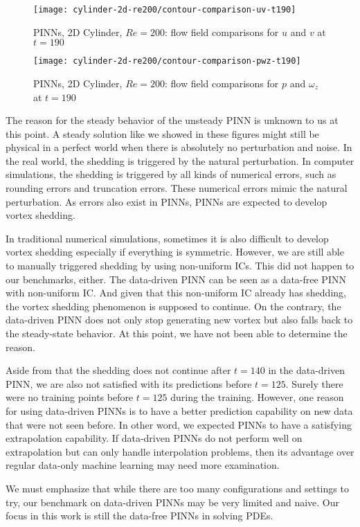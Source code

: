\begin{figure}[hbt!]
    \texttt{[image: cylinder-2d-re200/contour-comparison-uv-t190]}
    \caption{PINNs, 2D Cylinder, $Re=200$: flow field comparisons for $u$ and $v$ at $t=190$}
    \label{fig:cylinder-re200-contour-uv-t190}
\end{figure}

\begin{figure}[hbt!]
    \texttt{[image: cylinder-2d-re200/contour-comparison-pwz-t190]}
    \caption{PINNs, 2D Cylinder, $Re=200$: flow field comparisons for $p$ and $\omega_z$ at $t=190$}
    \label{fig:cylinder-re200-contour-pwz-t190}
\end{figure}

The reason for the steady behavior of the unsteady PINN is unknown to us at this point.
A steady solution like we showed in these figures might still be physical in a perfect world when there is absolutely no perturbation and noise.
In the real world, the shedding is triggered by the natural perturbation.
In computer simulations, the shedding is triggered by all kinds of numerical errors, such as rounding errors and truncation errors.
These numerical errors mimic the natural perturbation.
As errors also exist in PINNs, PINNs are expected to develop vortex shedding.

In traditional numerical simulations, sometimes it is also difficult to develop vortex shedding especially if everything is symmetric.
However, we are still able to manually triggered shedding by using non-uniform ICs.
This did not happen to our benchmarks, either.
The data-driven PINN can be seen as a data-free PINN with non-uniform IC.
And given that this non-uniform IC already has shedding, the vortex shedding phenomenon is supposed to continue.
On the contrary, the data-driven PINN does not only stop generating new vortex but also falls back to the steady-state behavior.
At this point, we have not been able to determine the reason.

Aside from that the shedding does not continue after $t=140$ in the data-driven PINN, we are also not satisfied with its predictions before $t=125$.
Surely there were no training points before $t=125$ during the training.
However, one reason for using data-driven PINNs is to have a better prediction capability on new data that were not seen before.
In other word, we expected PINNs to have a satisfying extrapolation capability.
If data-driven PINNs do not perform well on extrapolation but can only handle interpolation problems, then its advantage over regular data-only machine learning may need more examination.

We must emphasize that while there are too many configurations and settings to try, our benchmark on data-driven PINNs may be very limited and naive.
Our focus in this work is still the data-free PINNs in solving PDEs.
